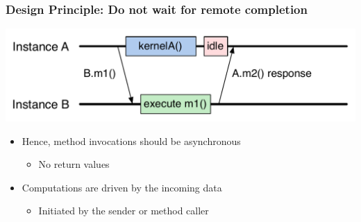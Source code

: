 \begin{frame}[fragile]
  \frametitle{Design Principle: Do not wait for remote completion}
  \begin{center}
    \includegraphics[width=\textwidth]{figures/objectSequenceAsync.pdf}
  \end{center}
  \begin{itemize}
  \item Hence, method invocations should be asynchronous
    \begin{itemize}
    \item No return values
    \end{itemize}
  \item Computations are driven by the incoming data
    \begin{itemize}
    \item Initiated by the sender or method caller
    \end{itemize}
  \end{itemize}
\end{frame}

